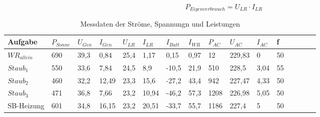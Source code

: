 \begin{equation}
	P_{ Eigenverbrauch }= U_{ LR} \cdot I_{ LR }
\label{eq:230509_Eigenverbrauch}
\end{equation} 


\begin{table}[!ht]
    \caption{Messdaten der Ströme, Spannungn und Leistungen }
	\centering
    \begin{tabular}{|l|l|l|l|l|l|l|l|l|l|l|l|l|l|l|l|}
    \hline
        Aufgabe & $P_{Sonne}$ & $U_{Gen}$ & $I_{Gen}$ & $U_{LR}$ & $I_{LR}$ & $I_{Batt}$ & $I_{WR}$ & $P_{AC}$ & $U_{AC}$ & $I_{AC}$ & f \\ \hline
        ${WR}_{allein}$ & 690 & 39,3 & 0,84 & 25,4 & 1,17 & 0,15 & 0,97 & 12 & 229,83 & 0 & 50 \\ \hline
        $Staub_{1}$ & 550 & 33,6 & 7,84 & 24,5 & 8,9 & -10,5 & 21,9 & 510 & 228,5 & 3,04 & 55  \\ \hline
        $Staub_{2}$ & 460 & 32,2 & 12,49 & 23,3 & 15,6 & -27,2 & 43,4 & 942 & 227,47 & 4,33 & 50 \\ \hline
        $Staub_{3}$ & 471 & 36,8 & 7,66 & 23,2 & 10,94 & -46,2 & 57,3 & 1208 & 226,98 & 5,05 & 50 \\ \hline
        SB-Heizung & 601 & 34,8 & 16,15 & 23,2 & 20,51 & -33,7 & 55,7 & 1186 & 227,4 & 5 & 50 \\ \hline
    \end{tabular}
	\label{tab:230512_Messtabelle}
\end{table}

